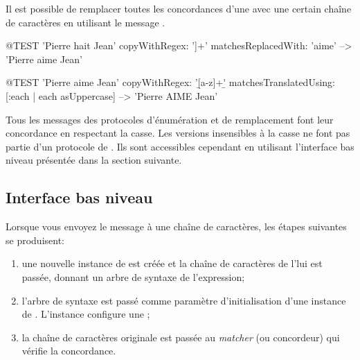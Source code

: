 \documentclass[a4paper,10pt,twoside]{book}
\begin{document}
{Il est possible de remplacer toutes les concordances d'une \expreg
avec une certain chaîne de caractères en utilisant le message  .

\begin{code}{@TEST}
'Pierre hait Jean' copyWithRegex: '\<[[:lower:]]+\>' matchesReplacedWith: 'aime' -->  'Pierre aime Jean'
\end{code}


\begin{code}{@TEST}
'Pierre aime Jean' copyWithRegex: '\b[a-z]+\b' matchesTranslatedUsing:
[:each | each asUppercase] --> 'Pierre AIME Jean'
\end{code}

Tous les messages des protocoles d'énumération et de remplacement font
leur concordance en respectant la casse. Les versions insensibles à la
casse ne font pas partie d'un protocole de .
Ils sont accessibles cependant en utilisant l'interface bas niveau
présentée dans la section suivante.
\subsection{Interface bas niveau}

Lorsque vous envoyez le message  à une
chaîne de caractères, les étapes suivantes se produisent:

\begin{enumerate}
\item une nouvelle instance de  est créée et la
  chaîne de caractères de l'\expreg lui est passée, donnant un arbre
  de syntaxe de l'expression;
\item  l'arbre de syntaxe est passé comme paramètre d'initialisation
  d'une instance de . L'instance configure une
  ;
\item la chaîne de caractères originale est passée au \emph{matcher}
  (ou concordeur)
  qui vérifie la concordance.
\end{enumerate}

}
\end{document}
